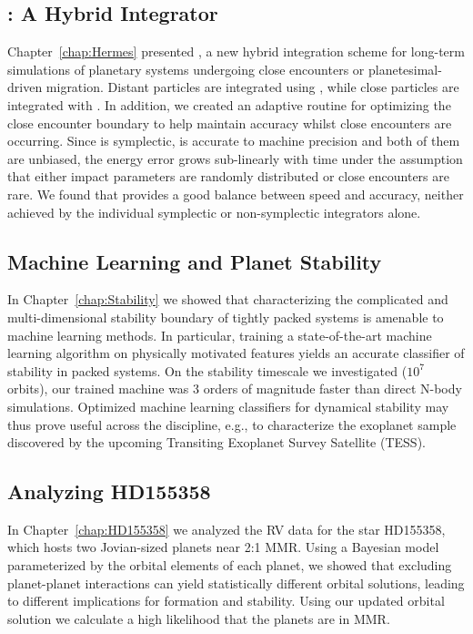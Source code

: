 \subsection{\hermes: A Hybrid Integrator}
Chapter~\ref{chap:Hermes} presented \hermes, a new hybrid integration scheme for long-term simulations of planetary systems undergoing close encounters or planetesimal-driven migration. 
Distant particles are integrated using \whfast, while close particles are integrated with \ias.
In addition, we created an adaptive routine for optimizing the close encounter boundary to help maintain accuracy whilst close encounters are occurring.
Since \whfast is symplectic, \ias is accurate to machine precision and both of them are unbiased, the energy error grows sub-linearly with time under the assumption that either impact parameters are randomly distributed or close encounters are rare.
We found that \hermes provides a good balance between speed and accuracy, neither achieved by the individual symplectic or non-symplectic integrators alone.

\subsection{Machine Learning and Planet Stability}
In Chapter~\ref{chap:Stability} we showed that characterizing the complicated and multi-dimensional stability boundary of tightly packed systems is amenable to machine learning methods. 
In particular, training a state-of-the-art machine learning algorithm on physically motivated features yields an accurate classifier of stability in packed systems. 
On the stability timescale we investigated ($10^7$ orbits), our trained machine was 3 orders of magnitude faster than direct N-body simulations. 
Optimized machine learning classifiers for dynamical stability may thus prove useful across the discipline, e.g., to characterize the exoplanet sample discovered by the upcoming Transiting Exoplanet Survey Satellite (TESS).

\subsection{Analyzing HD155358}
In Chapter~\ref{chap:HD155358} we analyzed the RV data for the star HD155358, which hosts two Jovian-sized planets near 2:1 MMR. 
Using a Bayesian model parameterized by the orbital elements of each planet, we showed that excluding planet-planet interactions can yield statistically different orbital solutions, leading to different implications for formation and stability. 
Using our updated orbital solution we calculate a high likelihood that the planets are in MMR. 

